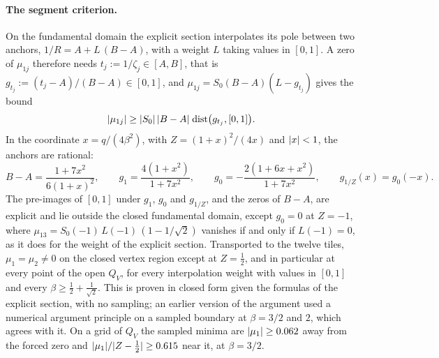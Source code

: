 \paragraph{The segment criterion.}
On the fundamental domain the explicit section interpolates its pole between two anchors, $1 / R = A + L \, (B - A)$, with a weight $L$ taking values in $[0, 1]$.
A zero of $\mu_{1j}$ therefore needs $t_j := 1 / \zeta_j \in [A, B]$, that is $g_{t_j} := (t_j - A) / (B - A) \in [0, 1]$, and $\mu_{1j} = S_0 (B - A)(L - g_{t_j})$ gives the bound
\begin{equation}
  {|\mu_{1j}|}
    \geq {|S_0|} \, {|B - A|} \; \mathrm{dist} \big( g_{t_j}, [0, 1] \big).
\end{equation}
In the coordinate $x = q / (4 \beta^2)$, with $Z = (1 + x)^2 / (4 x)$ and ${|x|} < 1$, the anchors are rational:
\begin{equation}
  \label{eq:wscircle:segment-rational}
  B - A
    = \frac{1 + 7 x^2}{6 (1 + x)^2},
  \qquad
  g_1
    = \frac{4 (1 + x^2)}{1 + 7 x^2},
  \qquad
  g_0
    = - \frac{2 (1 + 6 x + x^2)}{1 + 7 x^2},
  \qquad
  g_{1 / Z}(x)
    = g_0(- x).
\end{equation}
The pre-images of $[0, 1]$ under $g_1$, $g_0$ and $g_{1 / Z}$, and the zeros of $B - A$, are explicit and lie outside the closed fundamental domain, except $g_0 = 0$ at $Z = - 1$, where $\mu_{13} = S_0(-1) \, L(-1) \, (1 - 1 / \sqrt 2)$ vanishes if and only if $L(-1) = 0$, as it does for the weight of the explicit section.
Transported to the twelve tiles, $\mu_1 = \mu_2 \neq 0$ on the closed vertex region except at $Z = \tfrac{1}{2}$, and in particular at every point of the open $Q_V$, for every interpolation weight with values in $[0, 1]$ and every $\beta \geq \tfrac{1}{2} + \tfrac{1}{\sqrt 2}$.
This is proven in closed form given the formulas of the explicit section, with no sampling; an earlier version of the argument used a numerical argument principle on a sampled boundary at $\beta = 3 / 2$ and $2$, which agrees with it.
On a grid of $Q_V$ the sampled minima are ${|\mu_1|} \geq 0.062$ away from the forced zero and ${|\mu_1|} / {|Z - \tfrac{1}{2}|} \geq 0.615$ near it, at $\beta = 3 / 2$.


